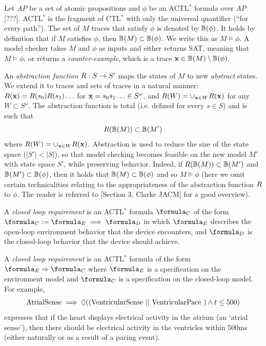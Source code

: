 Let $AP$ be a set of atomic propositions and $\phi$ be an ACTL$^*$ formula over $AP$ [???].
ACTL$^*$ is the fragment of CTL$^*$ with only the universal quantifier (``for every path'').
The set of $M$ traces that satisfy $\phi$ is denoted by $\mathbb{B}(\phi)$. 
It holds by definition that if $M$ satisfies $\phi$, then $\mathbb{B}(M) \subset \mathbb{B}(\phi)$.
We write this as $M \models \phi$.
A model checker takes $M$ and $\phi$ as inputs and either returns SAT, meaning that $M \models \phi$, or returns a \emph{counter-example}, which is a trace $\mathbf{x} \in \mathbb{B}(M) \setminus \mathbb{B}(\phi)$.

An \emph{abstraction function} $R: S \rightarrow S'$ maps the states of $M$ to new \emph{abstract} states.
We extend it to traces and sets of traces in a natural manner: $R(\mathbf{x}) =  R(s_0)R(s_1)\ldots$ for $\mathbf{x} = s_0 s_1\ldots \in S^\omega$,
and $R(W) = \cup_{\mathbf{x} \in W}R(\mathbf{x})$ for any $W \subset S^\omega$.
The abstraction function is total (i.e. defined for every $s \in S$) and is such that
\[R(\mathbb{B}(M)) \subset \mathbb{B}(M') \]
where $R(W) = \cup_{\mathbf{x} \in W} R(\mathbf{x})$.
Abstraction is used to reduce the size of the state space ($|S'| < |S|$), so that model checking becomes feasible on the new model $M'$ with state space $S'$, while preserving behavior.
Indeed, if $R(\mathbb{B}(M)) \subset  \mathbb{B}(M') $ and $\mathbb{B}(M') \subset \mathbb{B}(\phi)$, then it holds that $\mathbb{B}(M) \subset \mathbb{B}(\phi)$ and so $M \models \phi$ (here we omit certain technicalities relating to the appropriateness of the abstraction function $R$ to $\phi$. The reader is referred to [Section 3, Clarke JACM] for a good overview).

A \emph{closed loop requirement} is an ACTL$^*$ formula $\formula_C$ of the form $\formula_C :=\formula_E \implies \formula_D$ in which $\formula_E$ describes the open-loop environment behavior that the device encounters, and $\formula_D$ is the closed-loop behavior that the device should achieve. 

A \emph{closed loop requirement} is an ACTL$^*$ formula of the form$\formula_E\Rightarrow \formula_C$ where $\formula_E$ is a specification on the environment model and $\formula_C$ is a specification on the closed-loop model.
For example, 
\[\textrm{AtrialSense} \implies \Diamond ((\textrm{VentricularSense } ||  \textrm{ VentricularPace }) \wedge  t \leq 500)\]
 expresses that if the heart displays electrical activity in the atrium (an `atrial sense'), then there should be electrical activity in the ventricles within 500ms (either naturally or as a result of a pacing event).

